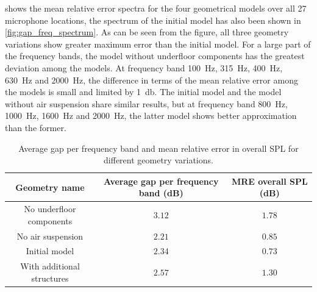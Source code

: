  shows the mean relative error spectra for the four geometrical models over all 27 microphone locations, the spectrum of the initial model has also been shown in \cref{fig:gap_freq_spectrum}. As can be seen from the figure, all three geometry variations show greater maximum error than the initial model. For a large part of the frequency bands, the model without underfloor components has the greatest deviation among the models. At frequency band \SI{100}{\hertz}, \SI{315}{\hertz}, \SI{400}{\hertz}, \SI{630}{\hertz} and \SI{2000}{\hertz}, the difference in terms of the mean relative error among the models is small and limited by \SI{1}{\decibel}. The initial model and the model without air suspension share similar results, but at frequency band \SI{800}{\hertz}, \SI{1000}{\hertz}, \SI{1600}{\hertz} and \SI{2000}{\hertz}, the latter model shows better approximation than the former.

\begin{table}
	\centering
	\caption{Average gap per frequency band and mean relative error in overall SPL for different geometry variations.}
	\label{tab:geometry_variation_MRE}
	\begin{tabular}{ccc}
		\toprule
		Geometry name              & Average gap per frequency band (dB) & MRE overall SPL (dB) \\
		\midrule
		No underfloor components   & $3.12$                       & $1.78$        \\
		No air suspension          & $2.21$                       & $0.85$        \\
		Initial model              & $2.34$                       & $0.73$        \\
		With additional structures & $2.57$                       & $1.30$ \\
		\bottomrule  
	\end{tabular}
\end{table}


